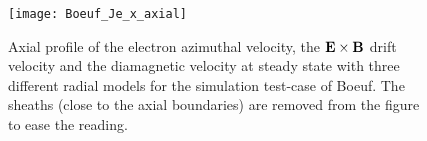    
  \begin{figure}[hbtp]
    \centering
    \texttt{[image: Boeuf\_Je\_x\_axial]}
    \caption{Axial profile of the electron azimuthal velocity, the ${\mathbf E} \times {\mathbf B}$ drift velocity and the diamagnetic velocity at steady state with three different radial models for the simulation test-case of Boeuf. The sheaths (close to the axial boundaries) are removed from the figure to ease the reading.}
    \label{fig-Jetheta}
  \end{figure}

